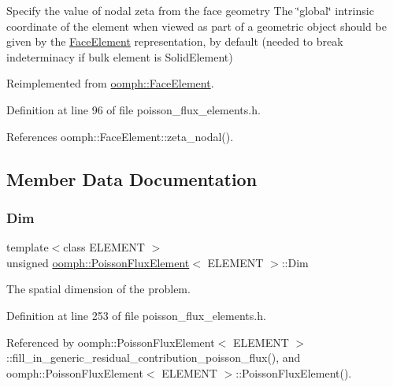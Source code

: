 Specify the value of nodal zeta from the face geometry The \char`\"{}global\char`\"{} intrinsic coordinate of the element when viewed as part of a geometric object should be given by the \hyperlink{classoomph_1_1FaceElement}{Face\+Element} representation, by default (needed to break indeterminacy if bulk element is Solid\+Element) 



Reimplemented from \hyperlink{classoomph_1_1FaceElement_a58c9f93705c7741f76c8487d152e68a6}{oomph\+::\+Face\+Element}.



Definition at line 96 of file poisson\+\_\+flux\+\_\+elements.\+h.



References oomph\+::\+Face\+Element\+::zeta\+\_\+nodal().



\subsection{Member Data Documentation}
\mbox{\label{classoomph_1_1PoissonFluxElement_a2ba672aba6d197451151700733254f4c}} 
\subsubsection{\texorpdfstring{Dim}{Dim}}
{\footnotesize\ttfamily template$<$class E\+L\+E\+M\+E\+NT $>$ \\
unsigned \hyperlink{classoomph_1_1PoissonFluxElement}{oomph\+::\+Poisson\+Flux\+Element}$<$ E\+L\+E\+M\+E\+NT $>$\+::Dim\hspace{0.3cm}{\ttfamily [private]}}



The spatial dimension of the problem. 



Definition at line 253 of file poisson\+\_\+flux\+\_\+elements.\+h.



Referenced by oomph\+::\+Poisson\+Flux\+Element$<$ E\+L\+E\+M\+E\+N\+T $>$\+::fill\+\_\+in\+\_\+generic\+\_\+residual\+\_\+contribution\+\_\+poisson\+\_\+flux(), and oomph\+::\+Poisson\+Flux\+Element$<$ E\+L\+E\+M\+E\+N\+T $>$\+::\+Poisson\+Flux\+Element().

